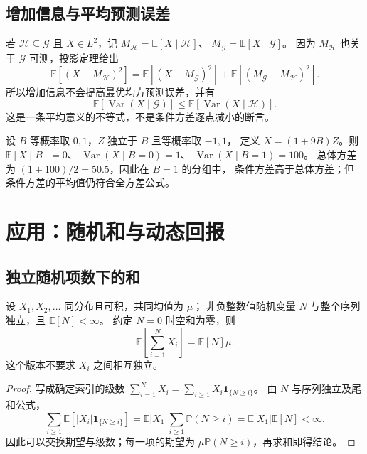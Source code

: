 \documentclass[UTF8,12pt,a4paper,fontset=fandol]{ctexart}
\begin{document}
\subsection{增加信息与平均预测误差}

若 $\mathcal H\subseteq\mathcal G$ 且 $X\in L^2$，记
$M_{\mathcal H}=\mathbb E[X\mid\mathcal H]$、
$M_{\mathcal G}=\mathbb E[X\mid\mathcal G]$。
因为 $M_{\mathcal H}$ 也关于 $\mathcal G$ 可测，投影定理给出
\[
  \mathbb E[(X-M_{\mathcal H})^2]
  =\mathbb E[(X-M_{\mathcal G})^2]
   +\mathbb E[(M_{\mathcal G}-M_{\mathcal H})^2].
\]
所以增加信息不会提高最优均方预测误差，并有
\[
  \mathbb E[\operatorname{Var}(X\mid\mathcal G)]
  \leq\mathbb E[\operatorname{Var}(X\mid\mathcal H)].
\]
这是一条平均意义的不等式，不是条件方差逐点减小的断言。

\begin{example}[某个分组的条件方差可以更大]
\label{ex:conditional-variance-increase}
设 $B$ 等概率取 $0,1$，$Z$ 独立于 $B$ 且等概率取 $-1,1$，
定义 $X=(1+9B)Z$。则
$\mathbb E[X\mid B]=0$、
$\operatorname{Var}(X\mid B=0)=1$、
$\operatorname{Var}(X\mid B=1)=100$。
总体方差为 $(1+100)/2=50.5$，因此在 $B=1$ 的分组中，
条件方差高于总体方差；但条件方差的平均值仍符合全方差公式。
\end{example}

\section{应用：随机和与动态回报}
\label{sec:expectation-applications}

\subsection{独立随机项数下的和}

\begin{proposition}[独立随机和的期望]
\label{prop:expectation-random-sum}
设 $X_1,X_2,\ldots$ 同分布且可积，共同均值为 $\mu$；
非负整数值随机变量 $N$ 与整个序列独立，且 $\mathbb E[N]<\infty$。
约定 $N=0$ 时空和为零，则
\begin{equation}
  \mathbb E\!\left[\sum_{i=1}^{N}X_i\right]
  =\mathbb E[N]\mu.
  \label{eq:expectation-random-sum}
\end{equation}
这个版本不要求 $X_i$ 之间相互独立。
\end{proposition}

\begin{proof}
写成确定索引的级数
$\sum_{i=1}^{N}X_i=\sum_{i\geq1}X_i\mathbf1_{\{N\geq i\}}$。
由 $N$ 与序列独立及尾和公式，
\[
  \sum_{i\geq1}\mathbb E[|X_i|\mathbf1_{\{N\geq i\}}]
  =\mathbb E|X_1|\sum_{i\geq1}\mathbb P(N\geq i)
  =\mathbb E|X_1|\mathbb E[N]<\infty.
\]
因此可以交换期望与级数；每一项的期望为
$\mu\mathbb P(N\geq i)$，再求和即得结论。
\end{proof}
\end{document}
